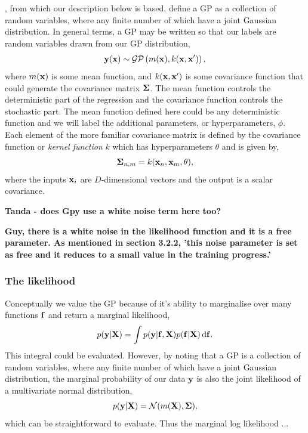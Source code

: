\citet{williams1996gaussian}, from which our description below is based,  define a GP as a collection of random variables, where any finite number of which have a joint Gaussian distribution.  In general terms,  a GP may be written so that our labels are random variables drawn from our GP distribution, 
\begin{equation}
{\bf y}({\bf x}) \sim \mathcal{GP}\left( m({\bf x}),  k({\bf x}, {\bf x'})\right),
\end{equation}
where $m({\bf x})$ is some mean function, and $k({\bf x}, {\bf x'})$ is some covariance function that could generate the covariance matrix $\bf \Sigma$.  The mean function controls the deterministic part of the regression and the covariance function controls the stochastic part.  The mean function defined here could be any deterministic function and we will label the additional parameters, or hyperparameters, $\phi$.  Each element of the more familiar covariance matrix is defined by the covariance function or {\it kernel function} $k$ which has hyperparameters $\theta$ and is given by,
\begin{equation}
{\bf \Sigma}_{n, m} = k({\bf x}_{n}, {\bf x}_{m},  \theta),
\end{equation}
where the inputs ${\bf x}_{i}$ are $D$-dimensional vectors and the output is a scalar covariance.

{\bf Tanda - does Gpy use a white noise term here too? }

{\bf Guy, there is a white noise in the likelihood function and it is a free parameter. As mentioned in section 3.2.2, 'this noise parameter is set as free and it reduces to a small value in the training progress.'}

\subsubsection{The likelihood}
Conceptually we value the GP because of it's ability to marginalise over many functions $\bf f$ and return a marginal likelihood,
\begin{equation}
p({\bf y} | {\bf X}) = \int p({\bf y} | {\bf f}, {\bf X}) p({\bf f} | {\bf X}) \, {\rm d}{\bf f}.
\end{equation}
This integral could be evaluated.  However, by noting that a GP is a collection of random variables, where any finite number of which have a joint Gaussian distribution, the marginal probability of our data $\bf y$ is also the joint likelihood of a multivariate normal distribution,
\begin{equation}
p({\bf y} | {\bf X}) = \mathcal{N}(m({\bf X}), {\bf \Sigma}),
\end{equation}
which can be straightforward to evaluate.  Thus the marginal log likelihood ... 

